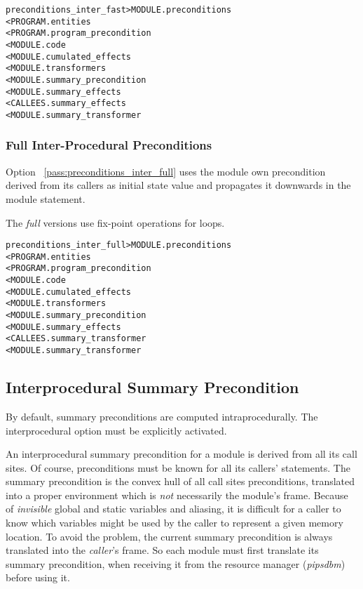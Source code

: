\documentclass[a4paper]{report}
\newenvironment{PipsMake}{\begin{alltt}}{\end{alltt}}
\newcommand{\PipsPassRef}[1]{\texttt{\detokenize{#1}}~\ref{pass:#1}}
\newenvironment{PipsPass}[1]{\label{pass:#1}}{}
\begin{document}
\begin{PipsMake}

preconditions_inter_fast        > MODULE.preconditions
        < PROGRAM.entities
        < PROGRAM.program_precondition
        < MODULE.code
        < MODULE.cumulated_effects
        < MODULE.transformers
        < MODULE.summary_precondition
        < MODULE.summary_effects
        < CALLEES.summary_effects
        < MODULE.summary_transformer
\end{PipsMake}

\subsubsection{Full Inter-Procedural Preconditions}

\begin{PipsPass}{preconditions_inter_full}
Option \PipsPassRef{preconditions_inter_full} uses the module own precondition
derived from its callers as initial state value and propagates it
downwards in the module statement.

The {\em full} versions use fix-point operations for loops.
\end{PipsPass}

\begin{PipsMake}
preconditions_inter_full        > MODULE.preconditions
        < PROGRAM.entities
        < PROGRAM.program_precondition
        < MODULE.code
        < MODULE.cumulated_effects
        < MODULE.transformers
        < MODULE.summary_precondition
        < MODULE.summary_effects
        < CALLEES.summary_transformer
        < MODULE.summary_transformer

\end{PipsMake}

\subsection{Interprocedural Summary Precondition}

By default, summary preconditions are computed intraprocedurally. The
interprocedural option must be explicitly activated.

\begin{PipsPass}{interprocedural_summary_precondition}
An interprocedural summary precondition for a module is derived from all
its call sites. Of course, preconditions must be known for all its
callers' statements.  The summary precondition is the convex hull of all
call sites preconditions, translated into a proper environment which is
{\em not} necessarily the module's frame. Because of {\em invisible}
global and static variables and aliasing, it is difficult for a caller to
know which variables might be used by the caller to represent a given
memory location. To avoid the problem, the current summary precondition is
always translated into the {\em caller}'s frame. So each module must first
translate its summary precondition, when receiving it from the resource
manager ({\em pipsdbm}) before using it.
\end{PipsPass}
\end{document}
